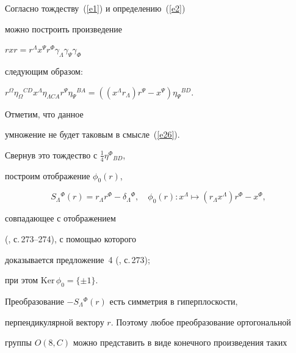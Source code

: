 \begin{pf}


Согласно тождеству~(\ref{e1}) и определению~(\ref{e2})


можно построить произведение


$rxr=r^\Lambda x^\Psi r^\Phi \gamma_\Lambda \gamma_\Psi \gamma_\Phi$


следующим образом:




$r^\Omega \eta_\Omega{}^{CD}x^\Lambda \eta_{\Lambda CA}


r^\Psi \eta_\Psi{}^{BA}=((x^\Lambda r_\Lambda)r^\Psi-x^\Psi)


\eta_\Psi{}^{BD}$.




Отметим, что данное


умножение не будет таковым в смысле~(\ref{e26}).


Свернув это тождество с $\frac{1}{4} \eta^\Phi{}_{BD}$,


построим отображение $\phi_0 (r)$,




$$


S_\Lambda{}^\Phi (r)=r_\Lambda r^\Phi-\delta_\Lambda{}^\Phi,\quad


\phi_0 (r): x^\Lambda \longmapsto (r_\Lambda x^\Lambda)


r^\Phi-x^\Phi,




$$


совпадающее с отображением


(\cite{Postnik1}, с.\,273--274), с помощью которого


доказывается предложение~4 (\cite{Postnik1}, с.\,273);


при этом $\text{Ker}\, \phi_0=\{\pm 1\}$.


\end{pf}





Преобразование $-S_\Lambda{}^\Phi (r)$ есть симметрия в гиперплоскости,


перпендикулярной вектору $r$. Поэтому любое преобразование ортогональной


группы $O(8,C)$ можно представить в виде конечного произведения таких


